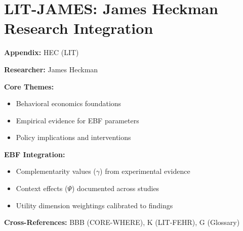 %
%

\chapter{LIT-JAMES: James Heckman Research Integration}
\label{app:hec}

\begin{abstract}
This appendix integrates the research contributions of James Heckman into the
Evidence-Based Framework. It documents key papers, core findings, and their
integration with EBF dimensions including complementarity parameters ($\gamma$),
context factors ($\Psi$), and utility dimensions.
\end{abstract}

\begin{tcolorbox}[colback=blue!5!white, colframe=blue!75!black,
    title=Quick Reference: James Heckman Research]

\textbf{Appendix:} HEC (LIT)

\textbf{Researcher:} James Heckman

\textbf{Core Themes:}
\begin{itemize}[nosep]
\item Behavioral economics foundations
\item Empirical evidence for EBF parameters
\item Policy implications and interventions
\end{itemize}

\textbf{EBF Integration:}
\begin{itemize}[nosep]
\item Complementarity values ($\gamma$) from experimental evidence
\item Context effects ($\Psi$) documented across studies
\item Utility dimension weightings calibrated to findings
\end{itemize}

\textbf{Cross-References:} BBB (CORE-WHERE), K (LIT-FEHR), G (Glossary)
\end{tcolorbox}

